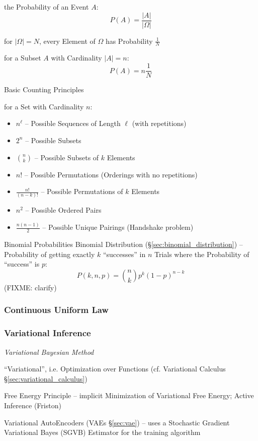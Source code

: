 the Probability of an Event $A$:
\[
  P(A) = \frac{|A|}{|\Omega|}
\]

for $|\Omega| = N$, every Element of $\Omega$ has Probability $\frac{1}{N}$

for a Subset $A$ with Cardinality $|A| = n$:
\[
  P(A) = n \frac{1}{N}
\]


Basic Counting Principles

for a Set with Cardinality $n$:
\begin{itemize}
  \item $n^\ell$ -- Possible Sequences of Length $\ell$ (with repetitions)
  \item $2^n$ -- Possible Subsets
  \item $\binom{n}{k}$ -- Possible Subsets of $k$ Elements
  \item $n!$ -- Possible Permutations (Orderings with no repetitions)
  \item $\frac{n!}{(n-k)!}$ -- Possible Permutations of $k$ Elements
  \item $n^2$ -- Possible Ordered Pairs
  \item $\frac{n(n-1)}{2}$ -- Possible Unique Pairings (Handshake problem)
\end{itemize}


Binomial Probabilities \fist Binomial Distribution
(\S\ref{sec:binomial_distribution}) -- Probability of getting exactly $k$
``successes'' in $n$ Trials where the Probability of ``success'' is $p$:
\[
  P(k,n,p) = \binom{n}{k}p^k(1-p)^{n-k}
\]
(FIXME: clarify)



\subsubsection{Continuous Uniform Law}\label{sec:continuous_uniform_law}

\subsubsection{Variational Inference}\label{sec:variational_inference}

\emph{Variational Bayesian Method}

``Variational'', i.e. Optimization over Functions (cf. Variational Calculus
\S\ref{sec:variational_calculus})

Free Energy Principle -- implicit Minimization of Variational Free Energy;
Active Inference (Friston)

Variational AutoEncoders (VAEs \S\ref{sec:vae}) -- uses a Stochastic Gradient
Variational Bayes (SGVB) Estimator for the training algorithm

